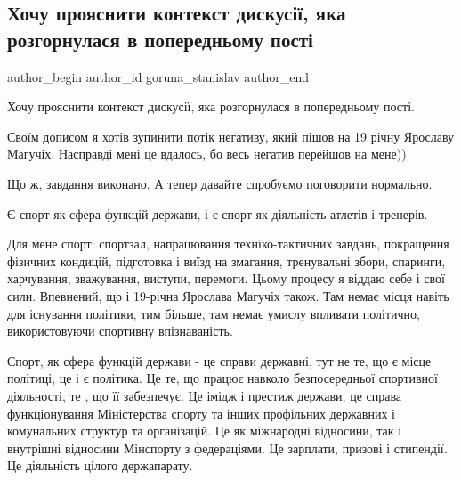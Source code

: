  
 
 
 
 
 
\subsection{Хочу прояснити контекст дискусії, яка розгорнулася в попередньому пості}
\label{sec:09_08_2021.fb.goruna_stanislav.1.maguchih_diskussia}
 
\ifcmt
 author_begin
   author_id goruna_stanislav
 author_end
\fi

Хочу прояснити контекст дискусії, яка розгорнулася в попередньому пості.

Своїм дописом я хотів зупинити потік негативу, який пішов на 19 річну Ярославу
Магучіх. Насправді мені це вдалось, бо весь негатив перейшов на мене))

Що ж, завдання виконано. А тепер давайте спробуємо поговорити нормально.

Є спорт як сфера функцій держави, і є спорт як діяльність атлетів і тренерів. 

Для мене спорт: спортзал, напрацювання техніко-тактичних завдань, покращення
фізичних кондицій, підготовка і виїзд на змагання, тренувальні збори, спаринги,
харчування, зважування, виступи, перемоги. Цьому процесу я віддаю себе і свої
сили. Впевнений, що і 19-річна Ярослава Магучіх також. Там немає місця навіть
для існування політики, тим більше, там немає умислу впливати політично,
використовуючи спортивну впізнаваність. 

Спорт, як сфера функцій держави - це справи державні, тут не те, що є місце
політиці, це і є політика. Це те, що працює навколо безпосередньої спортивної
діяльності, те , що її забезпечує. Це імідж і престиж держави, це справа
функціонування Міністерства спорту та інших профільних державних і комунальних
структур та організацій. Це як міжнародні відносини, так і внутрішні відносини
Мінспорту з федераціями. Це зарплати, призові і стипендії. Це діяльність цілого
держапарату.

